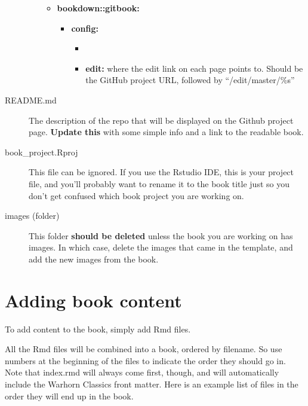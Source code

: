\documentclass[
]{book}
\providecommand{\tightlist}{%
  \setlength{\itemsep}{0pt}\setlength{\parskip}{0pt}}
\begin{document}
\begin{description}
\begin{itemize}
  \begin{itemize}
  \tightlist
  \item
    \textbf{bookdown::gitbook:}

    \begin{itemize}
    \tightlist
    \item
      \textbf{config:}

      \begin{itemize}
      \item
      \item
        \textbf{edit:} where the edit link on each page points to. Should be the GitHub project URL, followed by ``/edit/master/\%s''
      \end{itemize}
    \end{itemize}
  \end{itemize}
\end{itemize}
\item[README.md]
The description of the repo that will be displayed on the Github project page. \textbf{Update this} with some simple info and a link to the readable book.
\item[book\_project.Rproj]
This file can be ignored. If you use the Rstudio IDE, this is your project file, and you'll probably want to rename it to the book title just so you don't get confused which book project you are working on.
\item[images (folder)]
This folder \textbf{should be deleted} unless the book you are working on has images. In which case, delete the images that came in the template, and add the new images from the book.
\end{description}

\hypertarget{adding-book-content}{%
\section{Adding book content}\label{adding-book-content}}

To add content to the book, simply add Rmd files.

All the Rmd files will be combined into a book, ordered by filename. So use numbers at the beginning of the files to indicate the order they should go in. Note that index.rmd will always come first, though, and will automatically include the Warhorn Classics front matter. Here is an example list of files in the order they will end up in the book.
\end{document}
